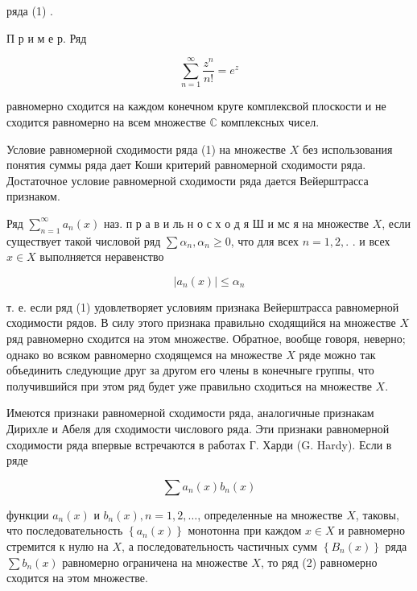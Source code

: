 \documentclass[10pt]{article}
\begin{document}
ряда (1) .



П р и м е р. Ряд



\[

\sum_{n=1}^{\infty} \frac{z^{n}}{n !}=e^{z}

\]



равномерно сходится на каждом конечном круге комплексвой плоскости и не сходится равномерно на всем множестве $\mathbb{C}$ комплексных чисел.



Условие равномерной сходимости ряда (1) на множестве $X$ без использования понятия суммы ряда дает Коши критерий равномерной сходимости ряда. Достаточное условие равномерной сходимости ряда дается Вейерштрасса признаком.



Ряд $\sum_{n=1}^{\infty} a_{n}(x)$ наз. п р а в и ль н о с х о д я Ш и мс я на множестве $X$, если существует такой числовой ряд $\sum \alpha_{n}, \alpha_{n} \geqslant 0$, что для всех $n=1,2,$. . и всех $x \in X$ выполняется неравенство



\[

\left|a_{n}(x)\right| \leqslant \alpha_{n}

\]



т. е. если ряд (1) удовлетворяет условиям признака Вейерштрасса равномерной сходимости рядов. В силу этого признака правильно сходящийся на множестве $X$ ряд равномерно сходится на этом множестве. Обратное, вообще говоря, неверно; однако во всяком равномерно сходящемся на множестве $X$ ряде можно так объединить следующие друг за другом его члены в конечныге группы, что получившийся при этом ряд будет уже правильно сходиться на множестве $X$.



Имеются признаки равномерной сходимости ряда, аналогичные признакам Дирихле и Абеля для сходимости числового ряда. Эти признаки равномерной сходимости ряда впервые встречаются в работах Г. Харди (G. Hardy). Если в ряде



\[

\sum a_{n}(x) b_{n}(x)

\]



функции $a_{n}(x)$ и $b_{n}(x), n=1,2, \ldots$, определенные на множестве $X$, таковы, что последовательность $\left\{a_{n}(x)\right\}$ монотонна при каждом $x \in X$ и равномерно стремится к нулю на $X$, а последовательность частичных сумм $\left\{B_{n}(x)\right\}$ ряда $\sum b_{n}(x)$ равномерно ограничена на множестве $X$, то ряд (2) равномерно сходится на этом множестве.
\end{document}
